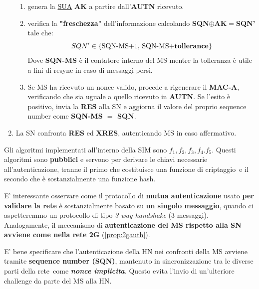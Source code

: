 \begin{proposition}
\begin{enumerate}
    \begin{enumerate}
        \item genera la \underline{SUA} \textbf{AK} a partire dall'\textbf{AUTN} ricevuto.
        \item verifica la \textbf{"freschezza"} dell'informazione calcolando \textbf{SQN}$\oplus$\textbf{AK}$=$\textbf{SQN'} tale che:
        \[SQN'\in\text{\{SQN-MS+1, SQN-MS+\textbf{tollerance}\}}\]
        Dove \textbf{SQN-MS} è il contatore interno del MS mentre la tolleranza è utile a fini di resync in caso di messaggi persi.
        \item Se MS ha ricevuto un nonce valido, procede a rigenerare il \textbf{MAC-A}, verificando che sia uguale a quello ricevuto in \textbf{AUTN}. Se l'esito è positivo, invia la \textbf{RES} alla SN e aggiorna il valore del proprio sequence number come \textbf{SQN-MS $=$ SQN}.
    \end{enumerate}
    \item La SN confronta \textbf{RES} ed \textbf{XRES}, autenticando MS in caso affermativo.
\end{enumerate}
\end{proposition}
\begin{remark}
Gli algoritmi implementati all'interno della SIM sono $f_1,f_2,f_3,f_4.f_5$. Questi algoritmi sono \textbf{pubblici} e servono per derivare le chiavi necessarie all'autenticazione, tranne il primo che costituisce una funzione di criptaggio\footnotemark\, e il secondo che è sostanzialmente una funzione hash.
\end{remark}
\begin{remark}
E' interessante osservare come il protocollo di \textbf{mutua autenticazione} usato \textbf{per validare la rete} è sostanzialmente basato su \textbf{un singolo messaggio}, quando ci aspetteremmo un protocollo di tipo \textit{3-way handshake} (3 messaggi). Analogamente, il meccanismo di \textbf{autenticazione del MS rispetto alla SN avviene come nella rete 2G} (\cref{prop:2gauth}).
\end{remark}
\begin{remark}
E' bene specificare che l'autenticazione della HN nei confronti della MS avviene tramite \textbf{sequence number (SQN)}, mantenuto in sincronizzazione tra le diverse parti della rete\footnotemark\, come \textbf{\textit{nonce implicita}}. Questo evita l'invio di un'ulteriore challenge da parte del MS alla HN.
\end{remark}
